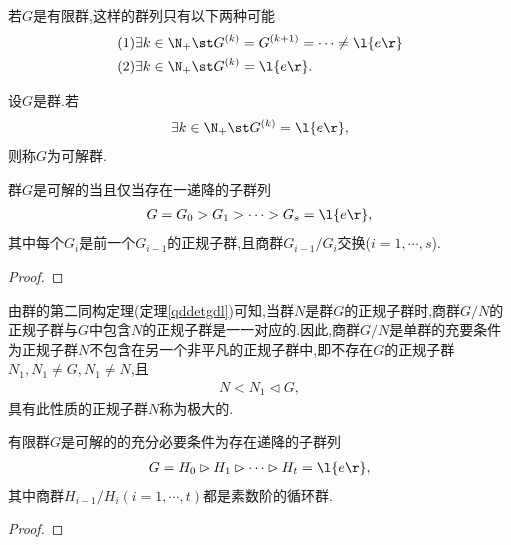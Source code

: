 若$G$是有限群,这样的群列只有以下两种可能\begin{align*}
    (1)&\exists k\in\N_+\st G^{(k)}=G^{(k+1)}=\cdots\neq\l\{e\r\}\\
    (2)&\exists k\in\N_+\st G^{(k)}=\l\{e\r\}.
\end{align*}
\begin{definition}[可解群]
    设$G$是群.若\begin{align*}
        \exists k\in\N_+\st G^{(k)}=\l\{e\r\},
    \end{align*}则称$G$为可解群.
\end{definition}
\begin{theorem}
    群$G$是可解的当且仅当存在一递降的子群列\begin{align*}
        G=G_0>G_1>\cdots>G_s=\l\{e\r\},
    \end{align*}其中每个$G_i$是前一个$G_{i-1}$的正规子群,且商群$G_{i-1}/G_i$交换($i=1,\cdots,s$).
\end{theorem}
\begin{proof}
    \stars
\end{proof}
由群的第二同构定理(定理\ref{qddetgdl})可知,当群$N$是群$G$的正规子群时,商群$G/N$的正规子群与$G$中包含$N$的正规子群是一一对应的.因此,商群$G/N$是单群的充要条件为正规子群$N$不包含在另一个非平凡的正规子群中,即不存在$G$的正规子群$N_1,N_1\neq G,N_1\neq N$,且\begin{align*}
    N<N_1\lhd G,
\end{align*}具有此性质的正规子群$N$称为极大的.
\begin{theorem}
    有限群$G$是可解的的充分必要条件为存在递降的子群列\begin{align*}
        G=H_0\rhd H_1\rhd\cdots\rhd H_t=\l\{e\r\},
    \end{align*}其中商群$H_{i-1}/H_i(i=1,\cdots,t)$都是素数阶的循环群.
\end{theorem}
\begin{proof}
    \stars
\end{proof}
